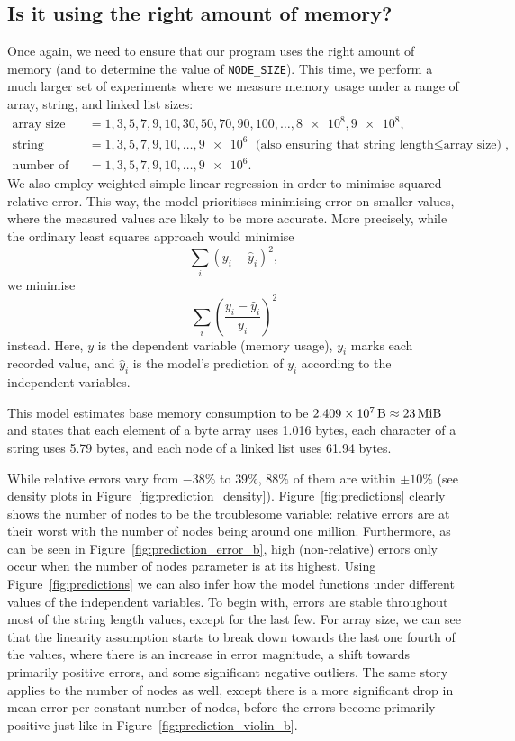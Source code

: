 \documentclass{article}
\begin{document}
\subsection{Is it using the right amount of memory?}

Once again, we need to ensure that our program uses the right amount of
memory (and to determine the value of \texttt{NODE\_SIZE}). This
time, we perform a much larger set of experiments where we measure memory usage
under a range of array, string, and linked list sizes:
\begin{align*}
  \text{array size} &= 1, 3, 5, 7, 9, 10, 30, 50, 70, 90, 100, \dots, \num{8e8}, \num{9e8}, \\
  \text{string length} &= 1, 3, 5, 7, 9, 10, \dots, \num{9e6} \text{ (also ensuring that $\text{string length} \le \text{array size}$)}, \\
  \text{number of nodes} &= 1, 3, 5, 7, 9, 10, \dots, \num{9e6}.
\end{align*}
We also employ weighted simple linear regression in order to minimise squared
relative error. This way, the model prioritises minimising error on smaller
values, where the measured values are likely to be more accurate. More
precisely, while the ordinary least squares approach would minimise
\[
  \sum_i (y_i - \hat{y}_i)^2,
\]
we minimise
\[
  \sum_i \left( \frac{y_i - \hat{y}_i}{y_i} \right)^2
\]
instead. Here, $y$ is the dependent variable (memory usage), $y_i$ marks each
recorded value, and $\hat{y}_i$ is the model's prediction of $y_i$ according to
the independent variables.

This model estimates base memory consumption to be $\SI{2.409e7}{\byte} \approx
\SI{23}{\mebi\byte}$ and states that each element of a byte array uses 1.016
bytes, each character of a string uses 5.79 bytes, and each node of a linked
list uses 61.94 bytes.

While relative errors vary from $-38\%$ to $39\%$, $88\%$ of them are within
$\pm10\%$ (see density plots in Figure~\ref{fig:prediction_density}).
Figure~\ref{fig:predictions} clearly shows the number of nodes to be the
troublesome variable: relative errors are at their worst with the number of
nodes being around one million. Furthermore, as can be seen in
Figure~\ref{fig:prediction_error_b}, high (non-relative) errors only occur when
the number of nodes parameter is at its highest. Using
Figure~\ref{fig:predictions} we can also infer how the model functions under
different values of the independent variables. To begin with, errors are stable
throughout most of the string length values, except for the last few. For array
size, we can see that the linearity assumption starts to break down towards the
last one fourth of the values, where there is an increase in error magnitude, a
shift towards primarily positive errors, and some significant negative outliers.
The same story applies to the number of nodes as well, except there is a more
significant drop in mean error per constant number of nodes, before the errors
become primarily positive just like in Figure~\ref{fig:prediction_violin_b}.
\end{document}
